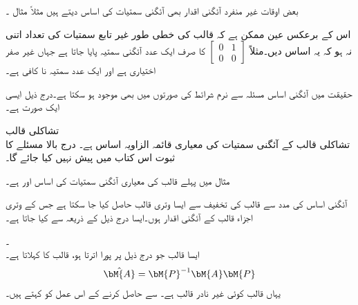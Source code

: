 بعض اوقات غیر منفرد آئگنی اقدار بھی آئگنی سمتیات کی اساس دیتے ہیں مثلاً مثال ۔

اس کے برعکس عین ممکن ہے کہ قالب کی خطی طور غیر تابع سمتیات کی تعداد اتنی نہ ہو کہ یہ اساس دیں۔مثلاً 
$[\begin{smallmatrix} 0&1\\0&0  \end{smallmatrix}]$
کا صرف ایک عدد آئگنی سمتیہ  پایا جاتا ہے جہاں  غیر صفر اختیاری ہے اور ایک عدد سمتیہ نا کافی ہے۔ 

حقیقت میں آئگنی اساس مسئلہ  سے نرم شرائط کی صورتوں میں بھی موجود ہو سکتا ہے۔درج ذیل ایسی ایک صورت ہے۔

\quad تشاکلی قالب\\
تشاکلی قالب کے آئگنی سمتیات  کی  معیاری قائمہ الزاویہ اساس  ہے۔  
درج بالا مسئلے کا ثبوت اس کتاب میں پیش نہیں کیا جائے گا۔

مثال  میں پہلے قالب کی معیاری آئگنی سمتیات کی اساس  اور
  ہے۔  

 آئگنی اساس کی مدد سے  قالب  کی تخفیف سے ایسا  وتری قالب حاصل کیا جا سکتا ہے جس کے وتری اجزاء قالب  کے آئگنی اقدار ہوں۔ایسا درج ذیل  کے ذریعہ سے کیا جاتا ہے۔

\quad {}۔ \\
ایسا  قالب  جو درج ذیل پر پورا اترتا ہو،  قالب  کا  کہلاتا ہے۔
\begin{align}
\hat{\bM{A}}=\bM{P}^{-1}\bM{A}\bM{P}
\end{align}
یہاں  قالب  کوئی غیر نادر قالب ہے۔ سے  حاصل کرنے کے اس عمل کو  کہتے ہیں۔

